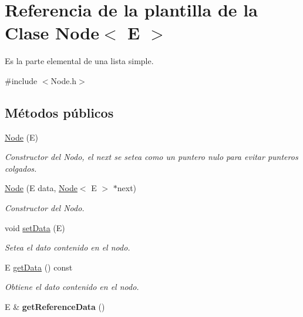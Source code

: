 \hypertarget{classNode}{\section{Referencia de la plantilla de la Clase Node$<$ E $>$}
\label{classNode}
}


Es la parte elemental de una lista simple.  




{\ttfamily \#include $<$Node.\-h$>$}

\subsection*{Métodos públicos}
\begin{DoxyCompactItemize}
\item 
\hyperlink{classNode_a74d41f93c30d8c3036d24894f0e4314e}{Node} (E)
\begin{DoxyCompactList}\small\item\em Constructor del Nodo, el next se setea como un puntero nulo para evitar punteros colgados. \end{DoxyCompactList}\item 
\hyperlink{classNode_adc1b4c81c3fb6d0580f138650629a41e}{Node} (E data, \hyperlink{classNode}{Node}$<$ E $>$ $\ast$next)
\begin{DoxyCompactList}\small\item\em Constructor del Nodo. \end{DoxyCompactList}\item 
void \hyperlink{classNode_ae13418a552fa36eddbaa5dfb767aa664}{set\-Data} (E)
\begin{DoxyCompactList}\small\item\em Setea el dato contenido en el nodo. \end{DoxyCompactList}\item 
E \hyperlink{classNode_a02a4e5126542aaa1a2150932cfa2b8ce}{get\-Data} () const 
\begin{DoxyCompactList}\small\item\em Obtiene el dato contenido en el nodo. \end{DoxyCompactList}\item 
\hypertarget{classNode_adec417c9f6f7d2cbd0fc7a72508e9c3d}{E \& {\bfseries get\-Reference\-Data} ()}\label{classNode_adec417c9f6f7d2cbd0fc7a72508e9c3d}


\end{DoxyCompactItemize}
